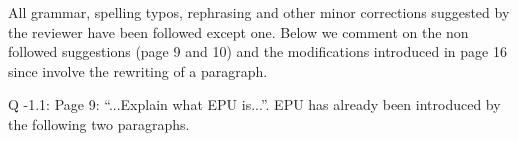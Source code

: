 \documentclass[a4paper,12pt]{article}
\begin{document}
\begin{reviewer}
% 
% 
% 
% 
% 
% 
% 
% 
% 


\reply All grammar, spelling typos, rephrasing and other minor corrections suggested by the reviewer have been followed except one. Below we comment on the non followed suggestions (page 9 and 10) and the modifications introduced in page 16 since involve the rewriting of a paragraph. 

Q \the\numexpr\value{pointcounter}-1\relax.1: Page 9: ``...Explain what EPU is...''. EPU has already been introduced by the following two paragraphs.


\end{reviewer}
\end{document}
